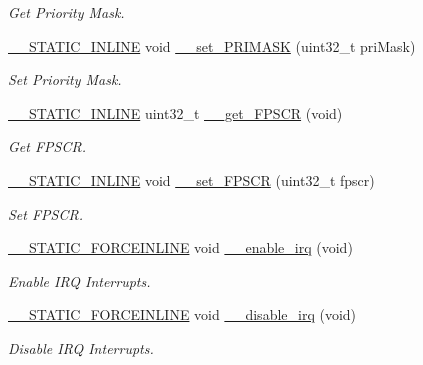 \begin{DoxyCompactItemize}
\begin{DoxyCompactList}\small\item\em Get Priority Mask. \end{DoxyCompactList}\item 
\hyperlink{cmsis__iccarm_8h_aba87361bfad2ae52cfe2f40c1a1dbf9c}{\+\_\+\+\_\+\+S\+T\+A\+T\+I\+C\+\_\+\+I\+N\+L\+I\+NE} void \hyperlink{group___c_m_s_i_s___core___reg_acc_functions_gaf4a17d3be7dbb066489836d849930d92}{\+\_\+\+\_\+set\+\_\+\+P\+R\+I\+M\+A\+SK} (uint32\+\_\+t pri\+Mask)
\begin{DoxyCompactList}\small\item\em Set Priority Mask. \end{DoxyCompactList}\item 
\hyperlink{cmsis__iccarm_8h_aba87361bfad2ae52cfe2f40c1a1dbf9c}{\+\_\+\+\_\+\+S\+T\+A\+T\+I\+C\+\_\+\+I\+N\+L\+I\+NE} uint32\+\_\+t \hyperlink{group___c_m_s_i_s___core___reg_acc_functions_ga6a275172e274ea7ce6c22030d07c6c64}{\+\_\+\+\_\+get\+\_\+\+F\+P\+S\+CR} (void)
\begin{DoxyCompactList}\small\item\em Get F\+P\+S\+CR. \end{DoxyCompactList}\item 
\hyperlink{cmsis__iccarm_8h_aba87361bfad2ae52cfe2f40c1a1dbf9c}{\+\_\+\+\_\+\+S\+T\+A\+T\+I\+C\+\_\+\+I\+N\+L\+I\+NE} void \hyperlink{group___c_m_s_i_s___core___reg_acc_functions_ga63aa6f7ed41dcaf39cbccb11e812ad4e}{\+\_\+\+\_\+set\+\_\+\+F\+P\+S\+CR} (uint32\+\_\+t fpscr)
\begin{DoxyCompactList}\small\item\em Set F\+P\+S\+CR. \end{DoxyCompactList}\item 
\hyperlink{cmsis__iccarm_8h_ab904513442afdf77d4f8c74f23cbb040}{\+\_\+\+\_\+\+S\+T\+A\+T\+I\+C\+\_\+\+F\+O\+R\+C\+E\+I\+N\+L\+I\+NE} void \hyperlink{group___c_m_s_i_s___core___reg_acc_functions_gae84bf4e95944e61937f4ed2453e5ef23}{\+\_\+\+\_\+enable\+\_\+irq} (void)
\begin{DoxyCompactList}\small\item\em Enable I\+RQ Interrupts. \end{DoxyCompactList}\item 
\hyperlink{cmsis__iccarm_8h_ab904513442afdf77d4f8c74f23cbb040}{\+\_\+\+\_\+\+S\+T\+A\+T\+I\+C\+\_\+\+F\+O\+R\+C\+E\+I\+N\+L\+I\+NE} void \hyperlink{group___c_m_s_i_s___core___reg_acc_functions_ga2299877e4ba3e162ca9dbabd6e0abef6}{\+\_\+\+\_\+disable\+\_\+irq} (void)
\begin{DoxyCompactList}\small\item\em Disable I\+RQ Interrupts. \end{DoxyCompactList}\end{DoxyCompactItemize}


